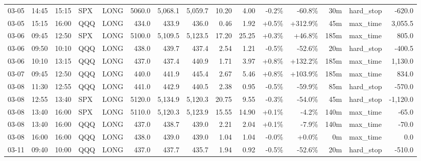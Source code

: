\documentclass[11pt,a4paper,twoside]{article}
\begin{document}
\begin{landscape}
\begin{center}
\begin{longtable}{>{\color{txtmain}}l l l l l r r r r r r r r >{\color{txtmain}}l r}
03-05 & 14:45 & 15:15 & SPX & LONG & 5060.0 & 5,068.1 & 5,059.7 & 10.20 & 4.00 & \textcolor{lossred}{-0.2\%} & \textcolor{lossred}{-60.8\%} & 30m & hard\_stop & \textcolor{lossred}{-620.0} \\
03-05 & 15:15 & 16:00 & QQQ & LONG & 434.0 & 433.9 & 436.0 & 0.46 & 1.92 & \textcolor{wingreen}{+0.5\%} & \textcolor{wingreen}{+312.9\%} & 45m & max\_time & \textcolor{wingreen}{3,055.5} \\
03-06 & 09:45 & 12:50 & SPX & LONG & 5100.0 & 5,109.5 & 5,123.5 & 17.20 & 25.25 & \textcolor{wingreen}{+0.3\%} & \textcolor{wingreen}{+46.8\%} & 185m & max\_time & \textcolor{wingreen}{805.0} \\
03-06 & 09:50 & 10:10 & QQQ & LONG & 438.0 & 439.7 & 437.4 & 2.54 & 1.21 & \textcolor{lossred}{-0.5\%} & \textcolor{lossred}{-52.6\%} & 20m & hard\_stop & \textcolor{lossred}{-400.5} \\
03-06 & 10:10 & 13:15 & QQQ & LONG & 437.0 & 437.4 & 440.9 & 1.71 & 3.97 & \textcolor{wingreen}{+0.8\%} & \textcolor{wingreen}{+132.2\%} & 185m & max\_time & \textcolor{wingreen}{1,130.0} \\
03-07 & 09:45 & 12:50 & QQQ & LONG & 440.0 & 441.9 & 445.4 & 2.67 & 5.46 & \textcolor{wingreen}{+0.8\%} & \textcolor{wingreen}{+103.9\%} & 185m & max\_time & \textcolor{wingreen}{834.0} \\
03-08 & 11:30 & 12:55 & QQQ & LONG & 441.0 & 442.9 & 440.5 & 2.38 & 0.95 & \textcolor{lossred}{-0.5\%} & \textcolor{lossred}{-59.9\%} & 85m & hard\_stop & \textcolor{lossred}{-570.0} \\
03-08 & 12:55 & 13:40 & SPX & LONG & 5120.0 & 5,134.9 & 5,120.3 & 20.75 & 9.55 & \textcolor{lossred}{-0.3\%} & \textcolor{lossred}{-54.0\%} & 45m & hard\_stop & \textcolor{lossred}{-1,120.0} \\
03-08 & 13:40 & 16:00 & SPX & LONG & 5110.0 & 5,120.3 & 5,123.9 & 15.55 & 14.90 & \textcolor{wingreen}{+0.1\%} & \textcolor{lossred}{-4.2\%} & 140m & max\_time & \textcolor{lossred}{-65.0} \\
03-08 & 13:40 & 16:00 & QQQ & LONG & 437.0 & 438.7 & 439.0 & 2.21 & 2.04 & \textcolor{wingreen}{+0.1\%} & \textcolor{lossred}{-7.9\%} & 140m & max\_time & \textcolor{lossred}{-70.0} \\
03-08 & 16:00 & 16:00 & QQQ & LONG & 438.0 & 439.0 & 439.0 & 1.04 & 1.04 & \textcolor{lossred}{-0.0\%} & \textcolor{wingreen}{+0.0\%} & 0m & max\_time & \textcolor{wingreen}{0.0} \\
03-11 & 09:40 & 10:00 & QQQ & LONG & 437.0 & 437.7 & 435.7 & 1.94 & 0.92 & \textcolor{lossred}{-0.5\%} & \textcolor{lossred}{-52.6\%} & 20m & hard\_stop & \textcolor{lossred}{-510.0} \\

\end{longtable}
\end{center}
\end{landscape}
\end{document}
